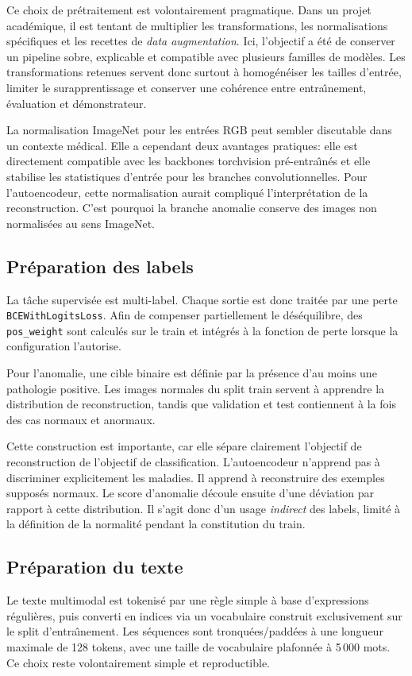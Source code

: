 \documentclass[11pt,a4paper]{article}
\begin{document}
Ce choix de pr\'etraitement est volontairement pragmatique. Dans un projet acad\'emique, il est tentant de multiplier les transformations, les normalisations sp\'ecifiques et les recettes de \emph{data augmentation}. Ici, l'objectif a \'et\'e de conserver un pipeline sobre, explicable et compatible avec plusieurs familles de mod\`eles. Les transformations retenues servent donc surtout \`a homog\'en\'eiser les tailles d'entr\'ee, limiter le surapprentissage et conserver une coh\'erence entre entra\^\i nement, \'evaluation et d\'emonstrateur.

La normalisation ImageNet pour les entr\'ees RGB peut sembler discutable dans un contexte m\'edical. Elle a cependant deux avantages pratiques: elle est directement compatible avec les backbones torchvision pr\'e-entra\^\i n\'es et elle stabilise les statistiques d'entr\'ee pour les branches convolutionnelles. Pour l'autoencodeur, cette normalisation aurait compliqu\'e l'interpr\'etation de la reconstruction. C'est pourquoi la branche anomalie conserve des images non normalis\'ees au sens ImageNet.

\subsection{Pr\'eparation des labels}
La t\^ache supervis\'ee est multi-label. Chaque sortie est donc trait\'ee par une perte \texttt{BCEWithLogitsLoss}. Afin de compenser partiellement le d\'es\'equilibre, des \texttt{pos\_weight} sont calcul\'es sur le train et int\'egr\'es \`a la fonction de perte lorsque la configuration l'autorise.

Pour l'anomalie, une cible binaire est d\'efinie par la pr\'esence d'au moins une pathologie positive. Les images normales du split train servent \`a apprendre la distribution de reconstruction, tandis que validation et test contiennent \`a la fois des cas normaux et anormaux.

Cette construction est importante, car elle s\'epare clairement l'objectif de reconstruction de l'objectif de classification. L'autoencodeur n'apprend pas \`a discriminer explicitement les maladies. Il apprend \`a reconstruire des exemples suppos\'es normaux. Le score d'anomalie d\'ecoule ensuite d'une d\'eviation par rapport \`a cette distribution. Il s'agit donc d'un usage \emph{indirect} des labels, limit\'e \`a la d\'efinition de la normalit\'e pendant la constitution du train.

\subsection{Pr\'eparation du texte}
Le texte multimodal est tokenis\'e par une r\`egle simple \`a base d'expressions r\'eguli\`eres, puis converti en indices via un vocabulaire construit exclusivement sur le split d'entra\^\i nement. Les s\'equences sont tronqu\'ees/padd\'ees \`a une longueur maximale de 128 tokens, avec une taille de vocabulaire plafonn\'ee \`a 5\,000 mots. Ce choix reste volontairement simple et reproductible.
\end{document}
